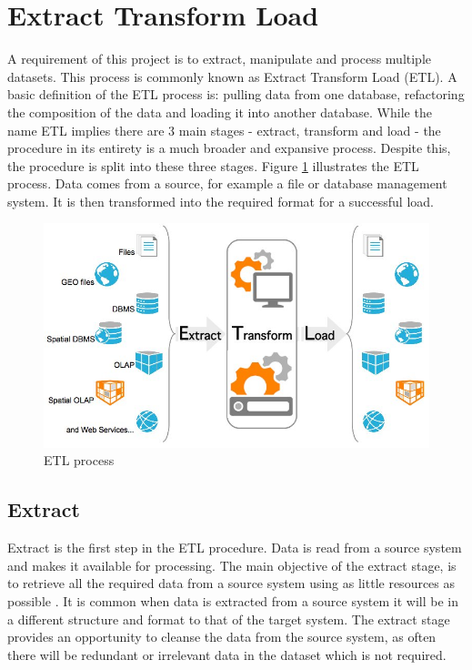 \section{Extract Transform Load}\label{etlprocess}
A requirement of this project is to extract, manipulate and process multiple datasets. This process is commonly known as Extract Transform Load (ETL). A basic definition of the ETL process is: pulling data from one database, refactoring the composition of the data and loading it into another database. While the name ETL implies there are 3 main stages - extract, transform and load - the procedure in its entirety is a much broader and expansive process. Despite this, the procedure is split into these three stages. Figure \ref{fig:etl} illustrates the ETL process. Data comes from a source, for example a file or database management system. It is then transformed into the required format for a successful load. \begin{figure}[h]\begin{center}\includegraphics[width=0.8\linewidth]{images/etl.jpg}\caption{ETL process}\label{fig:etl}\end{center}\end{figure}

\subsection{Extract}
Extract is the first step in the ETL procedure. Data is read from a source system and makes it available for processing. The main objective of the extract stage, is to retrieve all the required data from a source system using as little resources as possible \cite{etlref1}. It is common when data is extracted from a source system it will be in a different structure and format to that of the target system. The extract stage provides an opportunity to cleanse the data from the source system, as often there will be redundant or irrelevant data in the dataset which is not required.

